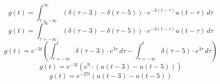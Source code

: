 \documentclass[10pt,a4paper, margin=1in]{article}
\begin{document}
\begin{enumerate}
\begin{enumerate}
    
    \[ g(t) = \int_{\tau=-\infty}^{\infty} (\delta(\tau-3) - \delta(\tau-5)) \cdot e^{-3(t-\tau)} u(t-\tau)  \,d\tau \]
    \[ g(t) = \int_{\tau=-\infty}^{\infty} (\delta(\tau-3) - \delta(\tau-5)) \cdot e^{-3(t-\tau)} u(t-\tau)  \,d\tau \]
    \[ g(t) = e^{-3t} (\int_{\tau=-\infty}^{t} \delta(\tau-3) \cdot e^{3\tau}  \,d\tau - \int_{\tau=-\infty}^{t} \delta(\tau-5) \cdot e^{3\tau}  \,d\tau ) \]
    \[ g(t) = e^{-3t} (e^9 \cdot (u(t-3) - u(t-5))) \]
    \[ g(t) = e^{-27t} (u(t-3) - u(t-5)) \]
    
    \end{enumerate}    

\end{enumerate}
\end{document}
